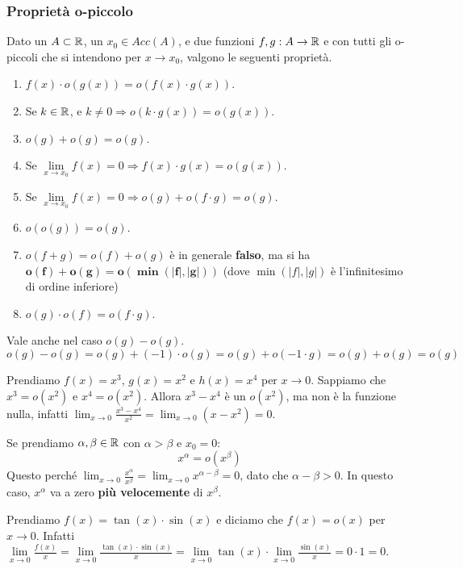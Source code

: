 \subsubsection{Proprietà o-piccolo}
Dato un $A \subset \mathbb{R}$, un $x_0 \in Acc(A)$, e due funzioni $f,g: A \to \mathbb{R}$ e con tutti gli o-piccoli che si intendono per $x\to x_0$, valgono le seguenti proprietà.
\begin{enumerate}
    \item $f(x) \cdot o(g(x)) = o(f(x) \cdot g(x))$.
    \item Se $k \in \mathbb{R}$, e $k \neq 0 \Longrightarrow o(k \cdot g(x)) = o(g(x))$.
    \item $o(g) + o(g) = o(g)$.
    \item Se $\lim\limits_{x\to x_0}f(x) = 0 \Longrightarrow f(x) \cdot g(x) = o(g(x))$.
    \item Se $\lim\limits_{x\to x_0}f(x) = 0 \Longrightarrow o(g) + o(f \cdot g) = o(g)$.
    \item $o(o(g)) = o(g)$.
    \item $o(f + g) = o(f) + o(g)$ è in generale \textbf{falso}, ma si ha $\mathbf{o(f) + o(g) = o(\min(|f|, |g|))}$ (dove $\min(|f|,|g|)$ è l'infinitesimo di ordine inferiore)
    \item $o(g) \cdot o(f) = o(f \cdot g)$.
\end{enumerate}

\begin{observation}
Vale anche nel caso $o(g) - o(g)$.
$$o(g) - o(g) = o(g) + (-1)\cdot o(g) = o(g) + o(-1 \cdot g) = o(g) + o(g) = o(g)$$ 
\end{observation}

\begin{example}
Prendiamo $f(x) = x^3$, $g(x) = x^2$ e $h(x) = x^4$ per $x\to 0$. Sappiamo che $x^3 = o(x^2)$ e $x^4 = o(x^2)$.
Allora $x^3 - x^4$ è un $o(x^2)$, ma non è la funzione nulla, infatti $\lim_{x\to 0} \frac{x^3 - x^4}{x^2} = \lim_{x\to 0} (x - x^2) = 0$.
\end{example}

\begin{observation}
Se prendiamo $\alpha, \beta \in \mathbb{R}$ con $\alpha > \beta$ e $x_0=0$:
$$ x^\alpha = o(x^\beta) $$
Questo perché $\lim_{x\to 0} \frac{x^\alpha}{x^\beta} = \lim_{x\to 0} x^{\alpha - \beta} = 0$, dato che $\alpha - \beta > 0$. In questo caso, $x^\alpha$ va a zero \textbf{più velocemente} di $x^\beta$.
\end{observation}

\begin{example}
Prendiamo $f(x) = \tan(x) \cdot \sin(x)$ e diciamo che $f(x) = o(x)$ per $x\to 0$.
Infatti $\lim\limits_{x\to 0}\frac{f(x)}{x} = \lim\limits_{x\to 0}\frac{\tan(x) \cdot \sin(x)}{x} = \lim\limits_{x\to 0}\tan(x) \cdot \lim\limits_{x\to 0}\frac{\sin(x)}{x} = 0 \cdot 1 = 0$.
\end{example}

